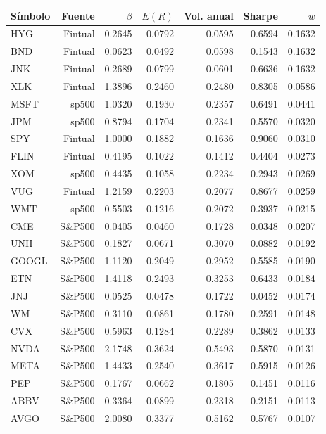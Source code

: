 \begin{table}[htbp]
\centering
\begin{tabular}{lrrrrrr}
\hline
Símbolo & Fuente & $\beta$ & $E(R)$ & Vol. anual & Sharpe & $w$ \\
\hline
HYG & Fintual & 0.2645 & 0.0792 & 0.0595 & 0.6594 & 0.1632 \\
BND & Fintual & 0.0623 & 0.0492 & 0.0598 & 0.1543 & 0.1632 \\
JNK & Fintual & 0.2689 & 0.0799 & 0.0601 & 0.6636 & 0.1632 \\
XLK & Fintual & 1.3896 & 0.2460 & 0.2480 & 0.8305 & 0.0586 \\
MSFT & sp500 & 1.0320 & 0.1930 & 0.2357 & 0.6491 & 0.0441 \\
JPM & sp500 & 0.8794 & 0.1704 & 0.2341 & 0.5570 & 0.0320 \\
SPY & Fintual & 1.0000 & 0.1882 & 0.1636 & 0.9060 & 0.0310 \\
FLIN & Fintual & 0.4195 & 0.1022 & 0.1412 & 0.4404 & 0.0273 \\
XOM & sp500 & 0.4435 & 0.1058 & 0.2234 & 0.2943 & 0.0269 \\
VUG & Fintual & 1.2159 & 0.2203 & 0.2077 & 0.8677 & 0.0259 \\
WMT & sp500 & 0.5503 & 0.1216 & 0.2072 & 0.3937 & 0.0215 \\
CME & S\&P500 & 0.0405 & 0.0460 & 0.1728 & 0.0348 & 0.0207 \\
UNH & S\&P500 & 0.1827 & 0.0671 & 0.3070 & 0.0882 & 0.0192 \\
GOOGL & S\&P500 & 1.1120 & 0.2049 & 0.2952 & 0.5585 & 0.0190 \\
ETN & S\&P500 & 1.4118 & 0.2493 & 0.3253 & 0.6433 & 0.0184 \\
JNJ & S\&P500 & 0.0525 & 0.0478 & 0.1722 & 0.0452 & 0.0174 \\
WM & S\&P500 & 0.3110 & 0.0861 & 0.1780 & 0.2591 & 0.0148 \\
CVX & S\&P500 & 0.5963 & 0.1284 & 0.2289 & 0.3862 & 0.0133 \\
NVDA & S\&P500 & 2.1748 & 0.3624 & 0.5493 & 0.5870 & 0.0131 \\
META & S\&P500 & 1.4433 & 0.2540 & 0.3617 & 0.5915 & 0.0126 \\
PEP & S\&P500 & 0.1767 & 0.0662 & 0.1805 & 0.1451 & 0.0116 \\
ABBV & S\&P500 & 0.3364 & 0.0899 & 0.2318 & 0.2151 & 0.0113 \\
AVGO & S\&P500 & 2.0080 & 0.3377 & 0.5162 & 0.5767 & 0.0107 \\

\end{tabular}
\end{table}
